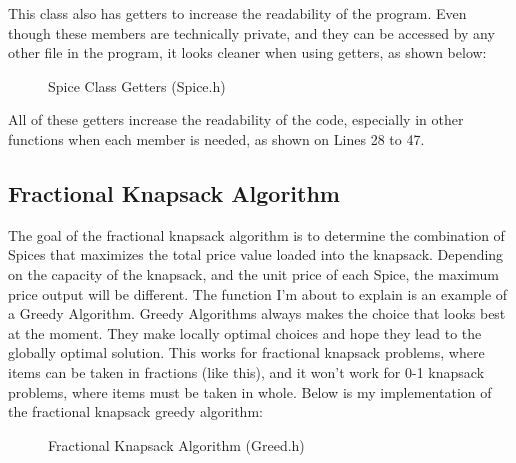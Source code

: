 \documentclass[letterpaper, 10pt]{article}
\begin{document}
\vspace{1em}
\noindent
This class also has getters to increase the readability of the program. Even though these members are technically private, and they can be accessed by any other file in the program, it looks cleaner when using getters, as shown below:

\begin{figure}[H]
  \centering
   
  \caption{Spice Class Getters (Spice.h)}
  \label{fig:figure3.4}
\end{figure}

\noindent
All of these getters increase the readability of the code, especially in other functions when each member is needed, as shown on Lines 28 to 47.

\vspace{5em}

\subsection{Fractional Knapsack Algorithm}
\noindent
The goal of the fractional knapsack algorithm is to determine the combination of Spices that maximizes the total price value loaded into the knapsack. Depending on the capacity of the knapsack, and the unit price of each Spice, the maximum price output will be different. The function I'm about to explain is an example of a Greedy Algorithm. Greedy Algorithms always makes the choice that looks best at the moment. They make locally optimal choices and hope they lead to the globally optimal solution. This works for fractional knapsack problems, where items can be taken in fractions (like this), and it won't work for 0-1 knapsack problems, where items must be taken in whole. Below is my implementation of the fractional knapsack greedy algorithm:

\begin{figure}[H]
  \centering
   
  \label{fig:figure3.5-part1}
\end{figure}

\begin{figure}[H]
  \centering
   
  \caption{Fractional Knapsack Algorithm (Greed.h)}
  \label{fig:figure3.5-part2}
\end{figure}
\end{document}

